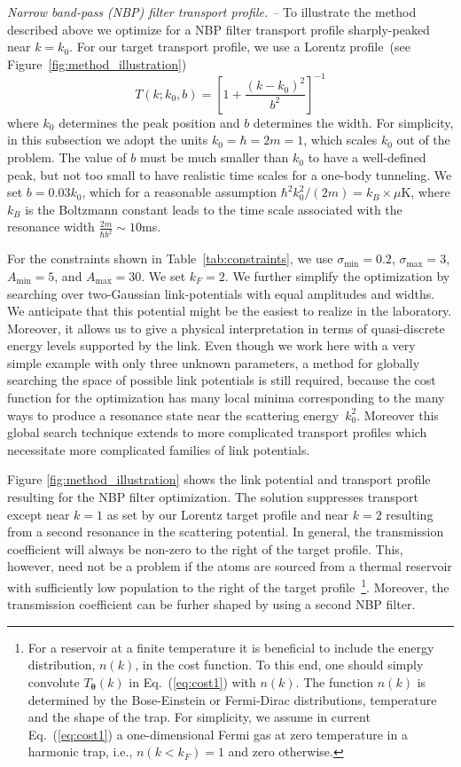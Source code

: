 \documentclass[reprint, twocolumn,amsmath,amssymb,showpacs,pra,superscriptaddress,aps]{revtex4-1}
\begin{document}
{\it Narrow band-pass (NBP) filter transport profile. --}
To illustrate the method described above we optimize for a NBP filter transport profile sharply-peaked near $k=k_0$. 
For our target transport profile, we use a Lorentz profile~(see Figure~\ref{fig:method_illustration})
\begin{equation}\label{eq:Ttarget}
  T(k; k_0,b) = \left[1 + \frac{(k-k_0)^2}{b^2}\right]^{-1}
\end{equation}
where $k_0$ determines the peak position and $b$ determines the width. 
For simplicity, in this subsection we adopt the units $k_0=\hbar=2m=1$, which scales $k_0$
out of the problem. The value of $b$ must be much smaller than $k_0$ 
to have a well-defined peak, but not too small to have realistic time scales
for a one-body tunneling. We set $b=0.03 k_0$, which for a reasonable assumption 
$\hbar^2k_0^2/(2m)=k_B\times \mu$K, where $k_B$ is the Boltzmann constant leads to 
the time scale associated with the resonance width $\frac{2m}{\hbar b^2}\sim 10$ms.

 For the constraints shown in Table~\ref{tab:constraints}, we use $\sigma_{\mathrm{min}}=0.2$, $\sigma_{\mathrm{max}}=3$, $A_{\mathrm{min}}=5$, and $A_{\mathrm{max}}=30$. We set $k_F=2$. We further simplify the optimization by searching over two-Gaussian link-potentials with equal amplitudes and widths. We anticipate that this potential might be the easiest to realize in the laboratory. 
Moreover, it allows us to give a physical interpretation in terms of quasi-discrete energy levels supported by the link.  Even though we work here with a very simple example with only three unknown parameters, a method for globally searching the space of possible link potentials is still required, because the cost function for the optimization has many local minima corresponding to the many ways to produce a resonance state near the scattering energy~$k_0^2$. Moreover this global search technique extends to more complicated transport profiles which necessitate more complicated families of link potentials.

Figure \ref{fig:method_illustration} shows the link potential and transport profile resulting for the NBP filter optimization. The solution suppresses transport except near $k=1$ as set by our Lorentz target profile and near $k=2$ resulting from a second resonance in the scattering potential. 
In general, the transmission coefficient will always be non-zero to the right of the target profile. 
This, however, need not be a problem if the atoms are sourced from a thermal reservoir with sufficiently low population to the right of the target profile~\footnote{For a reservoir at a finite temperature it is beneficial to include the energy distribution, $n(k)$,
in the cost function. To this end, one should simply convolute $T_{\bm{\theta}}(k)$ in Eq.~(\ref{eq:cost1}) with $n(k)$. 
The function $n(k)$ is determined by the Bose-Einstein or Fermi-Dirac distributions, temperature and the shape of the trap. For simplicity, 
we assume in current Eq.~(\ref{eq:cost1}) a one-dimensional Fermi gas at zero temperature in a harmonic trap, i.e., $n(k<k_F)=1$ and zero otherwise.}.
Moreover, the transmission coefficient can be furher shaped by using a second NBP filter.
 
\end{document}
